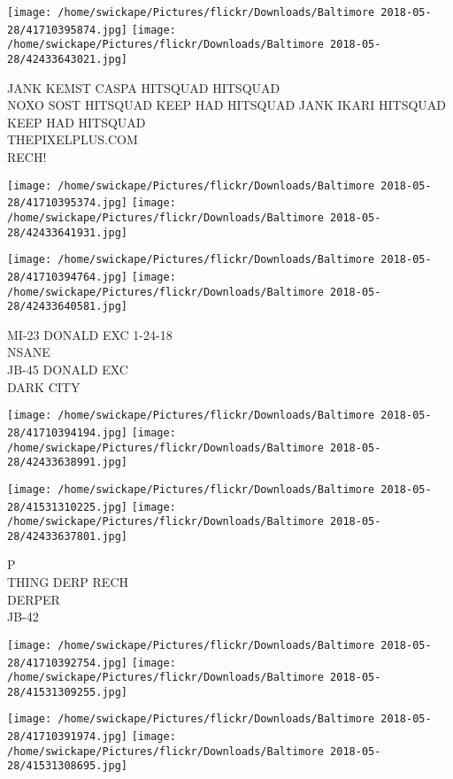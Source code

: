 \documentclass[10pt,letterpaper]{article}
\begin{document}
\texttt{[image: /home/swickape/Pictures/flickr/Downloads/Baltimore 2018-05-28/41710395874.jpg]}
\texttt{[image: /home/swickape/Pictures/flickr/Downloads/Baltimore 2018-05-28/42433643021.jpg]}

JANK KEMST CASPA HITSQUAD HITSQUAD\\
NOXO SOST HITSQUAD KEEP HAD HITSQUAD JANK IKARI HITSQUAD KEEP HAD HITSQUAD\\
THEPIXELPLUS.COM\\
RECH!\\
\pagebreak

\texttt{[image: /home/swickape/Pictures/flickr/Downloads/Baltimore 2018-05-28/41710395374.jpg]}
\texttt{[image: /home/swickape/Pictures/flickr/Downloads/Baltimore 2018-05-28/42433641931.jpg]}

\texttt{[image: /home/swickape/Pictures/flickr/Downloads/Baltimore 2018-05-28/41710394764.jpg]}
\texttt{[image: /home/swickape/Pictures/flickr/Downloads/Baltimore 2018-05-28/42433640581.jpg]}

MI{-}23 DONALD EXC 1{-}24{-}18\\
NSANE\\
JB{-}45 DONALD EXC\\
DARK CITY\\
\pagebreak

\texttt{[image: /home/swickape/Pictures/flickr/Downloads/Baltimore 2018-05-28/41710394194.jpg]}
\texttt{[image: /home/swickape/Pictures/flickr/Downloads/Baltimore 2018-05-28/42433638991.jpg]}

\texttt{[image: /home/swickape/Pictures/flickr/Downloads/Baltimore 2018-05-28/41531310225.jpg]}
\texttt{[image: /home/swickape/Pictures/flickr/Downloads/Baltimore 2018-05-28/42433637801.jpg]}

P\\
THING DERP RECH\\
DERPER\\
JB{-}42\\
\pagebreak

\texttt{[image: /home/swickape/Pictures/flickr/Downloads/Baltimore 2018-05-28/41710392754.jpg]}
\texttt{[image: /home/swickape/Pictures/flickr/Downloads/Baltimore 2018-05-28/41531309255.jpg]}

\texttt{[image: /home/swickape/Pictures/flickr/Downloads/Baltimore 2018-05-28/41710391974.jpg]}
\texttt{[image: /home/swickape/Pictures/flickr/Downloads/Baltimore 2018-05-28/41531308695.jpg]}
\end{document}

